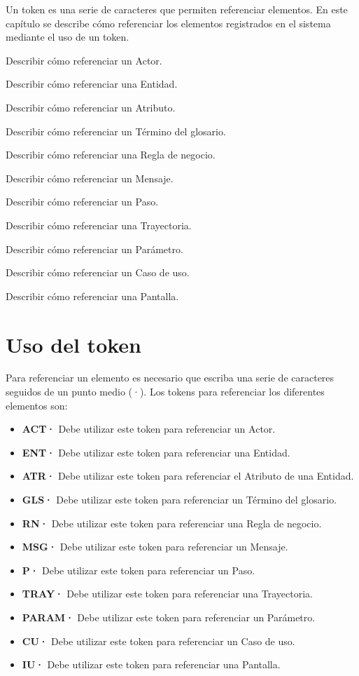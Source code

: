 
Un token es una serie de caracteres que permiten referenciar elementos.
En este capítulo se describe cómo referenciar los elementos registrados en el sistema mediante el uso de un token. \\


\begin{objetivos}
	\item Describir cómo referenciar un Actor.
	\item Describir cómo referenciar una Entidad.
	\item Describir cómo referenciar un Atributo.
	\item Describir cómo referenciar un Término del glosario.
	\item Describir cómo referenciar una Regla de negocio.
	\item Describir cómo referenciar un Mensaje.
	\item Describir cómo referenciar un Paso.
	\item Describir cómo referenciar una Trayectoria.
	\item Describir cómo referenciar un Parámetro.
	\item Describir cómo referenciar un Caso de uso.
	\item Describir cómo referenciar una Pantalla.
\end{objetivos}

\section{Uso del token}

Para referenciar un elemento es necesario que escriba una serie de caracteres seguidos de un punto medio (·). Los tokens para referenciar los diferentes elementos son:

\begin{itemize}
 \item {\bf ACT·} Debe utilizar este token para referenciar un Actor.
 \item {\bf ENT·} Debe utilizar este token para referenciar una Entidad.
 \item {\bf ATR·} Debe utilizar este token para referenciar el Atributo de una Entidad.
 \item {\bf GLS·} Debe utilizar este token para referenciar un Término del glosario.
 \item {\bf RN·} Debe utilizar este token para referenciar una Regla de negocio.
 \item {\bf MSG·} Debe utilizar este token para referenciar un Mensaje.
 \item {\bf P·} Debe utilizar este token para referenciar un Paso.
 \item {\bf TRAY·} Debe utilizar este token para referenciar una Trayectoria.
 \item {\bf PARAM·} Debe utilizar este token para referenciar un Parámetro.
 \item {\bf CU·} Debe utilizar este token para referenciar un Caso de uso.
 \item {\bf IU·} Debe utilizar este token para referenciar una Pantalla.
 
\end{itemize}


